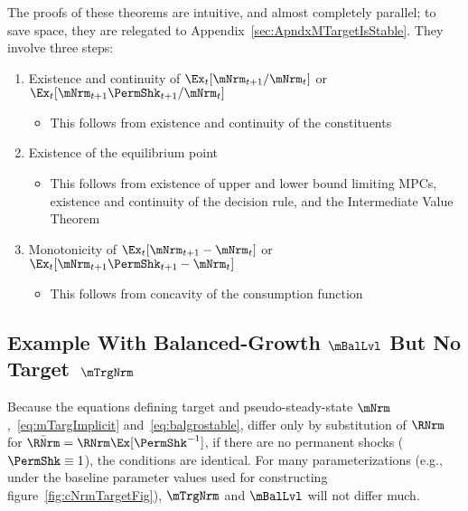 \documentclass[BufferStockTheory]{subfiles}
\begin{document}
The proofs of these theorems are intuitive, and almost completely parallel; to save space, they are relegated to Appendix~\ref{sec:ApndxMTargetIsStable}.  They involve three steps:
\begin{enumerate}
\item Existence and continuity of $\Ex_{t}[\mNrm_{t+1}/\mNrm_{t}]$ or $\Ex_{t}[\mNrm_{t+1}\PermShk_{t+1}/\mNrm_{t}]$
  \begin{itemize}
  \item This follows from existence and continuity of the constituents
  \end{itemize}
\item Existence of the equilibrium point
  \begin{itemize}
  \item This follows from existence of upper and lower bound limiting MPCs, existence and continuity of the decision rule, and the Intermediate Value Theorem
  \end{itemize}
\item Monotonicity of $\Ex_{t}[{\mNrm}_{t+1}-\mNrm_{t}]$ or $\Ex_{t}[{\mNrm}_{t+1}\PermShk_{t+1}-\mNrm_{t}]$
  \begin{itemize}
  \item This follows from concavity of the consumption function
  \end{itemize}
\end{enumerate}

\subsection{Example With Balanced-Growth \texorpdfstring{$\mBalLvl$}{m} But No Target~\texorpdfstring{$\mTrgNrm$}{m}}

Because the equations defining target and pseudo-steady-state $\mNrm$,~\eqref{eq:mTargImplicit} and~\eqref{eq:balgrostable}, differ only by substitution of $\RNrm$ for $\bar{\RNrm}=\RNrm \Ex[\PermShk^{-1}]$, if there are no permanent shocks ($\PermShk \equiv 1$), the conditions are identical.  For many parameterizations (e.g., under the baseline parameter values used for constructing figure~\ref{fig:cNrmTargetFig}), $\mTrgNrm$ and $\mBalLvl$ will not differ much.

\renewcommand{\figFile}{GICModFailsButGICRawHolds}
\hypertarget{\figFile}{}

\end{document}
